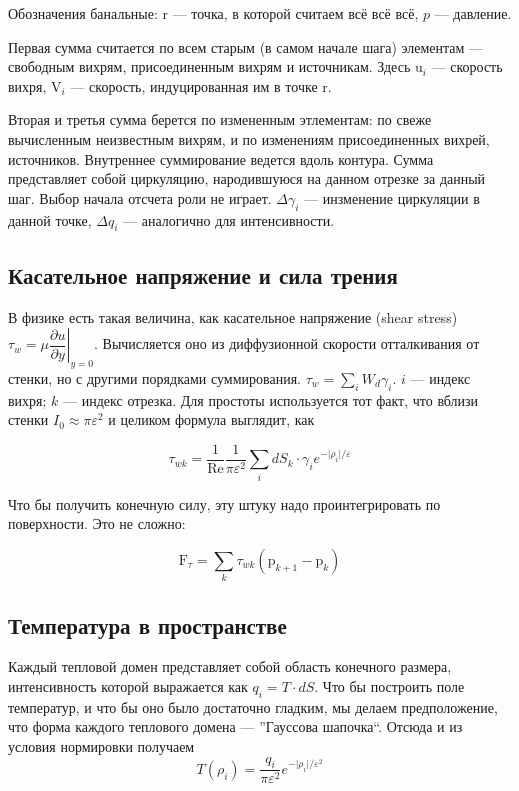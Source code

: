 \documentclass[14pt]{extreport}
\newcommand{\br}[1]{\boldsymbol{\mathrm{#1}}}
\newcommand{\Reyn}{\text{Re}}
\begin{document}
Обозначения банальные: $\br r$ --- точка, в которой считаем всё всё всё,
$p$ --- давление.

Первая сумма считается по всем старым (в самом начале шага) элементам ---
свободным вихрям, присоединенным вихрям и источникам. Здесь
$\br u_i$ --- скорость вихря,
$\br V_i$ --- скорость, индуцированная им в точке $\br r$.

Вторая и третья сумма берется по измененным этлементам: по свеже 
вычисленным неизвестным вихрям, и по изменениям присоединенных вихрей, источников.
Внутреннее суммирование ведется вдоль контура. Сумма представляет собой циркуляцию,
народившуюся на данном отрезке за данный шаг. Выбор начала отсчета роли не играет.
$\Delta \gamma_i$ --- инзменение циркуляции в данной точке,
$\Delta q_i$ --- аналогично для интенсивности.

\subsection{Касательное напряжение и сила трения}

В физике есть такая величина, как касательное напряжение (shear stress) $\tau_w = \mu \left. \dfrac{\partial u}{\partial y} \right|_{y=0}$. Вычисляется оно из диффузионной скорости отталкивания от стенки, но с другими порядками суммирования. $ \tau_w = \sum_i {W_d \gamma_i}$. $i$ --- индекс вихря; $k$ --- индекс отрезка. Для простоты используется тот факт, что вблизи стенки $I_0 \approx \pi\varepsilon^2$ и целиком формула выглядит, как

$$ \tau_{wk} = \dfrac{1}{\Reyn}\dfrac{1}{\pi\varepsilon^2} \sum\limits_i dS_k\cdot \gamma_i e^{-\lvert\rho_i\rvert/\varepsilon}$$

Что бы получить конечную силу, эту штуку надо проинтегрировать по поверхности. Это не сложно:

$$ \br F_\tau = \sum_k {\tau_{wk} (\br p_{k+1} - \br p_k) } $$

\subsection{Температура в пространстве}
Каждый тепловой домен представляет собой область конечного размера, интенсивность которой выражается как $q_i = T \cdot dS$. Что бы построить поле температур, и что бы оно было достаточно гладким, мы делаем предположение, что форма каждого теплового домена --- ''Гауссова шапочка``. Отсюда и из условия нормировки получаем
$$T(\rho_i) = \dfrac{q_i}{\pi \varepsilon^2} e^{-\lvert \rho_i \rvert / \varepsilon^2}$$
\end{document}
